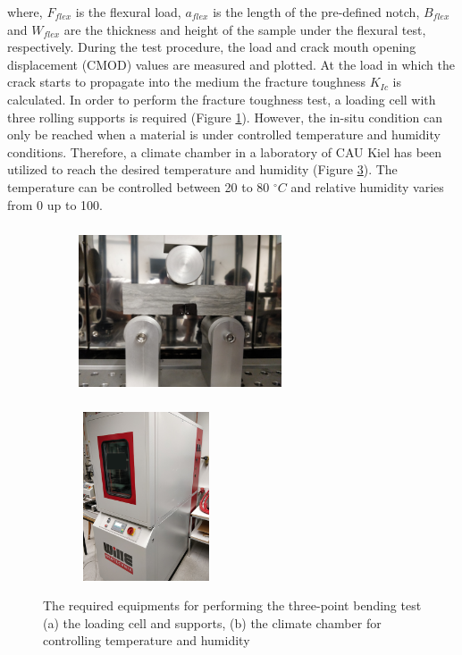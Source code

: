 where, $F_{flex}$ is the flexural load, $a_{flex}$ is the length of the pre-defined notch, $B_{flex}$ and $W_{flex}$ are the thickness and height of the sample under the flexural test, respectively. During the test procedure, the load and crack mouth opening displacement (CMOD) values are measured and plotted. At the load in which the crack starts to propagate into the medium the fracture toughness $K_{Ic}$ is calculated. In order to perform the fracture toughness test, a loading cell with three rolling supports is required (Figure \ref{fig:Amir_Fracture_Toughness_Setup_a}). However, the in-situ condition can only be reached when a material is under controlled temperature and humidity conditions. Therefore, a climate chamber in a laboratory of CAU Kiel has been utilized to reach the desired temperature and humidity (Figure \ref{fig:Amir_Fracture_Toughness_Setup_b}). The temperature can be controlled between 20 to 80 $^{\circ}C$ and relative humidity varies from 0 up to 100. 

\begin{figure}[!ht]
\centering
\begin{subfigure}[c]{0.5\textwidth}
\centering
\includegraphics[width=6cm,height=5cm]{figures/Amir_Fracture_Toughness_Setup_a.png}
\subcaption{}
\label{fig:Amir_Fracture_Toughness_Setup_a}
\end{subfigure}
\hfill
\begin{subfigure}[c]{0.48\textwidth}
\centering
\includegraphics[width=4cm,height=5cm]{figures/Amir_Fracture_Toughness_Setup_b.png}
\subcaption{}
\label{fig:Amir_Fracture_Toughness_Setup_b}
\end{subfigure}
\caption{The required equipments for performing the three-point bending test (a) the loading cell and supports, (b) the climate chamber for controlling temperature and humidity}
\end{figure}

